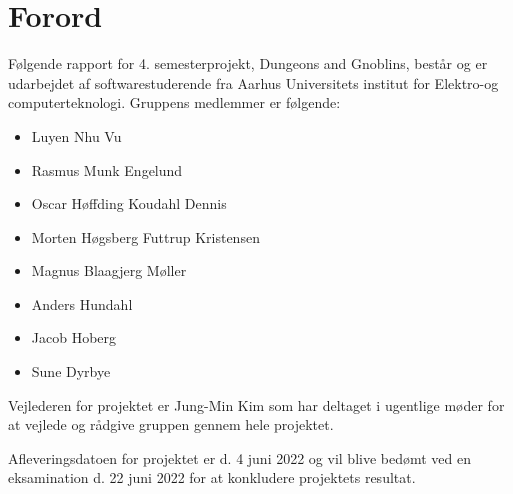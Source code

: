 \section{Forord}
Følgende rapport for 4.  semesterprojekt, Dungeons and Gnoblins, består og er udarbejdet af softwarestuderende fra Aarhus Universitets institut for Elektro-og computerteknologi. Gruppens medlemmer er følgende:

\begin{itemize}
\item Luyen Nhu Vu
\item Rasmus Munk Engelund
\item Oscar Høffding Koudahl Dennis
\item Morten Høgsberg Futtrup Kristensen
\item Magnus Blaagjerg Møller
\item Anders Hundahl
\item Jacob Hoberg
\item Sune Dyrbye
\end{itemize}


Vejlederen for projektet er Jung-Min Kim som har deltaget i ugentlige møder for at vejlede og rådgive gruppen gennem hele projektet.

Afleveringsdatoen for projektet er d. 4 juni 2022 og vil blive bedømt ved en eksamination d. 22 juni 2022 for at konkludere projektets resultat.